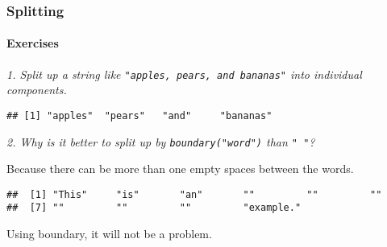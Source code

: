 \documentclass[]{article}
\newenvironment{Shaded}{\begin{snugshade}}{\end{snugshade}}
\newcommand{\KeywordTok}[1]{\textcolor[rgb]{0.13,0.29,0.53}{\textbf{#1}}}
\newcommand{\DecValTok}[1]{\textcolor[rgb]{0.00,0.00,0.81}{#1}}
\newcommand{\StringTok}[1]{\textcolor[rgb]{0.31,0.60,0.02}{#1}}
\newcommand{\OperatorTok}[1]{\textcolor[rgb]{0.81,0.36,0.00}{\textbf{#1}}}
\newcommand{\NormalTok}[1]{#1}
\let\oldparagraph\paragraph
\renewcommand{\paragraph}[1]{\oldparagraph{#1}\mbox{}}
\theoremstyle{definition}
\theoremstyle{definition}
\theoremstyle{definition}
\theoremstyle{remark}
\begin{document}
\subsubsection{Splitting}\label{splitting}

\paragraph{Exercises}\label{exercises-35}

\emph{1. Split up a string like \texttt{"apples,\ pears,\ and\ bananas"}
into individual components.}

\begin{Shaded}
\end{Shaded}

\begin{verbatim}
## [1] "apples"  "pears"   "and"     "bananas"
\end{verbatim}

\emph{2. Why is it better to split up by \texttt{boundary("word")} than
\texttt{"\ "}?}

Because there can be more than one empty spaces between the words.

\begin{Shaded}
\end{Shaded}

\begin{verbatim}
##  [1] "This"     "is"       "an"       ""         ""         ""        
##  [7] ""         ""         ""         "example."
\end{verbatim}

Using boundary, it will not be a problem.

\begin{Shaded}
\end{Shaded}
\end{document}
